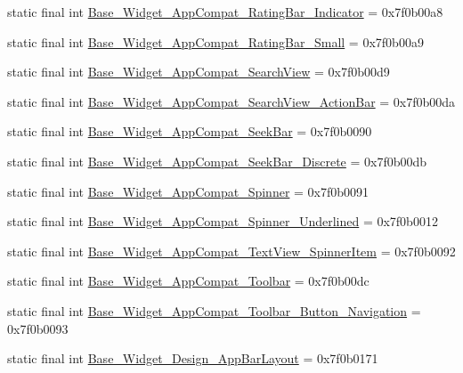 \begin{CompactItemize}
\item 
static final int \hyperlink{classandroid_1_1support_1_1v7_1_1palette_1_1_r_1_1style_5307bed65c8b4a46a98cb28261ea5ad9}{Base\_\-Widget\_\-AppCompat\_\-RatingBar\_\-Indicator} = 0x7f0b00a8
\item 
static final int \hyperlink{classandroid_1_1support_1_1v7_1_1palette_1_1_r_1_1style_53f9b7b1cbcbdc1e6e2ffb6f06a1569e}{Base\_\-Widget\_\-AppCompat\_\-RatingBar\_\-Small} = 0x7f0b00a9
\item 
static final int \hyperlink{classandroid_1_1support_1_1v7_1_1palette_1_1_r_1_1style_7a6ab2b9e67ba8aa67b5f64cf3115a1a}{Base\_\-Widget\_\-AppCompat\_\-SearchView} = 0x7f0b00d9
\item 
static final int \hyperlink{classandroid_1_1support_1_1v7_1_1palette_1_1_r_1_1style_aa8c565ef453b004b9f4b73d43b11929}{Base\_\-Widget\_\-AppCompat\_\-SearchView\_\-ActionBar} = 0x7f0b00da
\item 
static final int \hyperlink{classandroid_1_1support_1_1v7_1_1palette_1_1_r_1_1style_76676894269a6bb9f2f7cd8e3fa3a1dd}{Base\_\-Widget\_\-AppCompat\_\-SeekBar} = 0x7f0b0090
\item 
static final int \hyperlink{classandroid_1_1support_1_1v7_1_1palette_1_1_r_1_1style_92d7d96cb1916d2263dbd99ec68991ec}{Base\_\-Widget\_\-AppCompat\_\-SeekBar\_\-Discrete} = 0x7f0b00db
\item 
static final int \hyperlink{classandroid_1_1support_1_1v7_1_1palette_1_1_r_1_1style_5ead756af3300d2a3c0307b4b893f285}{Base\_\-Widget\_\-AppCompat\_\-Spinner} = 0x7f0b0091
\item 
static final int \hyperlink{classandroid_1_1support_1_1v7_1_1palette_1_1_r_1_1style_92f80817b4be6dd68b7f9ae9bd56e063}{Base\_\-Widget\_\-AppCompat\_\-Spinner\_\-Underlined} = 0x7f0b0012
\item 
static final int \hyperlink{classandroid_1_1support_1_1v7_1_1palette_1_1_r_1_1style_74d301b29f03e68687d74c301854b479}{Base\_\-Widget\_\-AppCompat\_\-TextView\_\-SpinnerItem} = 0x7f0b0092
\item 
static final int \hyperlink{classandroid_1_1support_1_1v7_1_1palette_1_1_r_1_1style_8b981ae8df94522722c659598243763c}{Base\_\-Widget\_\-AppCompat\_\-Toolbar} = 0x7f0b00dc
\item 
static final int \hyperlink{classandroid_1_1support_1_1v7_1_1palette_1_1_r_1_1style_474dd22f8f1402e977568b74f4a5ed7c}{Base\_\-Widget\_\-AppCompat\_\-Toolbar\_\-Button\_\-Navigation} = 0x7f0b0093
\item 
static final int \hyperlink{classandroid_1_1support_1_1v7_1_1palette_1_1_r_1_1style_ef7d81d7bc31268849ab760fb8193298}{Base\_\-Widget\_\-Design\_\-AppBarLayout} = 0x7f0b0171

\end{CompactItemize}
